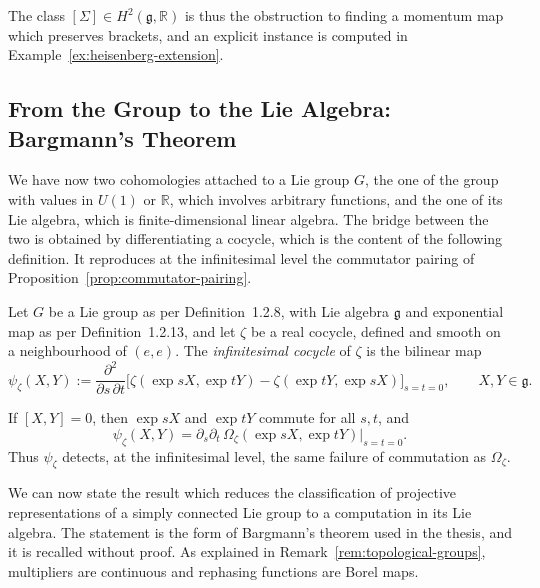 \noindent The class $[\Sigma]\in H^2(\mathfrak{g},\mathbb{R})$ is thus the obstruction to finding a momentum map which preserves brackets, and an explicit instance is computed in Example~\ref{ex:heisenberg-extension}.

\subsection{From the Group to the Lie Algebra: Bargmann's Theorem}\label{subsec:bargmann}

We have now two cohomologies attached to a Lie group $G$, the one of the group with values in $U(1)$ or $\mathbb{R}$, which involves arbitrary functions, and the one of its Lie algebra, which is finite-dimensional linear algebra. The bridge between the two is obtained by differentiating a cocycle, which is the content of the following definition. It reproduces at the infinitesimal level the commutator pairing of Proposition~\ref{prop:commutator-pairing}.

\begin{definition}\label{def:infinitesimal-cocycle}
	Let $G$ be a Lie group as per Definition~1.2.8, with Lie algebra $\mathfrak{g}$ and exponential map as per Definition~1.2.13, and let $\zeta$ be a real cocycle, defined and smooth on a neighbourhood of $(e,e)$. The \emph{infinitesimal cocycle} of $\zeta$ is the bilinear map
	\begin{equation*}
		\psi_\zeta(X,Y):=\frac{\partial^2}{\partial s\,\partial t}\Big[\zeta(\exp sX,\exp tY)-\zeta(\exp tY,\exp sX)\Big]_{s=t=0}, \qquad X,Y\in\mathfrak{g}.
	\end{equation*}
\end{definition}

\begin{remark}
	If $[X,Y]=0$, then $\exp sX$ and $\exp tY$ commute for all $s,t$, and $$\psi_\zeta(X,Y)=\partial_s\partial_t\,\Omega_\zeta(\exp sX,\exp tY)|_{s=t=0}.$$ Thus $\psi_\zeta$ detects, at the infinitesimal level, the same failure of commutation as $\Omega_\zeta$.
\end{remark}

We can now state the result which reduces the classification of projective representations of a simply connected Lie group to a computation in its Lie algebra. The statement is the form of Bargmann's theorem used in the thesis, and it is recalled without proof. As explained in Remark~\ref{rem:topological-groups}, multipliers are continuous and rephasing functions are Borel maps.

